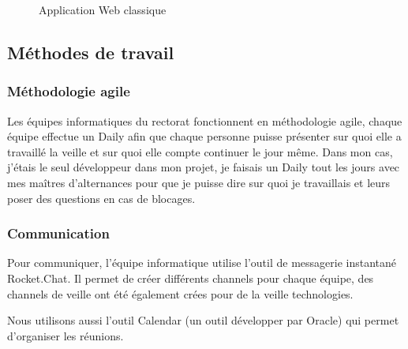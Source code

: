 \documentclass[a4paper]{article}
\begin{document}
\begin{figure}[H]
	\centering
  		\caption{Application Web classique}
	\end{figure}

\subsection{Méthodes de travail}
\subsubsection{Méthodologie agile}

Les équipes informatiques du rectorat fonctionnent en méthodologie agile, chaque équipe effectue un Daily afin que chaque personne puisse présenter sur quoi elle a travaillé la veille et sur quoi elle compte continuer le jour même. Dans mon cas, j'étais le seul développeur dans mon projet, je faisais un Daily tout les jours avec mes maîtres d'alternances pour que je puisse dire sur quoi je travaillais et leurs poser des questions en cas de blocages. 

\subsubsection{Communication}

Pour communiquer, l'équipe informatique utilise l'outil de messagerie instantané Rocket.Chat. Il permet de créer différents
channels pour chaque équipe, des channels de veille ont été également crées pour de la veille technologies.

Nous utilisons aussi l'outil Calendar (un outil développer par Oracle) qui permet d’organiser les réunions.  
\end{document}
